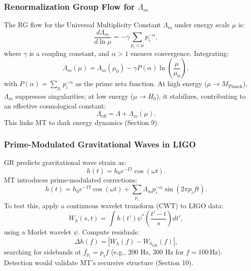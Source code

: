 \documentclass{article}
\theoremstyle{plain}
\begin{document}
\subsubsection{Renormalization Group Flow for \(\Lambda_m\)}
The RG flow for the Universal Multiplicity Constant \(\Lambda_m\) under energy scale \(\mu\) is:
\begin{equation}
\frac{d \Lambda_m}{d \ln \mu} = -\gamma \sum_{p_i < \mu} p_i^{-\alpha},
\end{equation}
where \( \gamma \) is a coupling constant, and \( \alpha > 1 \) ensures convergence. Integrating:
\begin{equation}
\Lambda_m(\mu) = \Lambda_m(\mu_0) - \gamma P(\alpha) \ln \left( \frac{\mu}{\mu_0} \right),
\end{equation}
with \( P(\alpha) = \sum_{p_i} p_i^{-\alpha} \) as the prime zeta function. At high energy (\(\mu \to M_{\text{Planck}}\)), \(\Lambda_m\) suppresses singularities; at low energy (\(\mu \to H_0\)), it stabilizes, contributing to an effective cosmological constant:
\begin{equation}
\Lambda_{\text{eff}} = \Lambda + \Lambda_m(\mu).
\end{equation}
This links MT to dark energy dynamics (Section 9).

\subsubsection{Prime-Modulated Gravitational Waves in LIGO}
GR predicts gravitational wave strain as:
\begin{equation}
h(t) = h_0 e^{-\Gamma t} \cos(\omega t).
\end{equation}
MT introduces prime-modulated corrections:
\begin{equation}
h(t) = h_0 e^{-\Gamma t} \cos(\omega t) + \sum_{p_i} \Lambda_m p_i^{-\alpha} \sin(2 \pi p_i f t).
\end{equation}
To test this, apply a continuous wavelet transform (CWT) to LIGO data:
\begin{equation}
W_h(s, t) = \int h(t') \psi^*\left( \frac{t' - t}{s} \right) dt',
\end{equation}
using a Morlet wavelet \(\psi\). Compute residuals:
\begin{equation}
\Delta h(f) = |W_h(f) - W_{h_{\text{GR}}}(f)|,
\end{equation}
searching for sidebands at \( f_{p_i} = p_i f \) (e.g., 200 Hz, 300 Hz for \( f = 100 \, \text{Hz} \)). Detection would validate MT’s recursive structure (Section 10).
\end{document}
